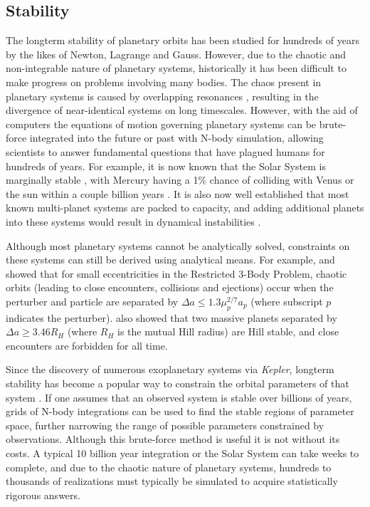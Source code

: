 \documentclass[12pt,letter]{aastex}
\newcommand{\kep}{{\it Kepler}\xspace}
\begin{document}
\subsection{Stability}
The longterm stability of planetary orbits has been studied for hundreds of years by the likes of Newton, Lagrange and Gauss. 
However, due to the chaotic and non-integrable nature of planetary systems, historically it has been difficult to make progress on problems involving many bodies.  
The chaos present in planetary systems is caused by overlapping resonances \citep{Chirikov1979, Lecar2001}, resulting in the divergence of near-identical systems on long timescales. 
However, with the aid of computers the equations of motion governing planetary systems can be brute-force integrated into the future or past with N-body simulation, allowing scientists to answer fundamental questions that have plagued humans for hundreds of years. 
For example, it is now known that the Solar System is marginally stable \citep{Sussman1988, Laskar1994, Lecar2001}, with Mercury having a 1\% chance of colliding with Venus or the sun within a couple billion years \citep{Laskar2009}.
It is also now well established that most known multi-planet systems are packed to capacity, and adding additional planets into these systems would result in dynamical instabilities \citep{Fang2013,Pu2015}.

Although most planetary systems cannot be analytically solved, constraints on these systems can still be derived using analytical means.
For example, \citet{Wisdom1980} and \citet{Duncan1989} showed that for small eccentricities in the Restricted 3-Body Problem, chaotic orbits (leading to close encounters, collisions and ejections) occur when the perturber and particle are separated by $\Delta a \le 1.3\mu_p^{2/7}a_p$ (where subscript $p$ indicates the perturber). 
\citet{Gladman1993} also showed that two massive planets separated by $\Delta a \ge 3.46 R_H$ (where $R_H$ is the mutual Hill radius) are Hill stable, and close encounters are forbidden for all time. 

Since the discovery of numerous exoplanetary systems via \kep, longterm stability has become a popular way to constrain the orbital parameters of that system \citep{Lissauer2011, Steffen2013, Jontof-Hutter2014, Tamayo2015}. 
If one assumes that an observed system is stable over billions of years, grids of N-body integrations can be used to find the stable regions of parameter space, further narrowing the range of possible parameters constrained by observations. 
Although this brute-force method is useful it is not without its costs. 
A typical 10 billion year integration or the Solar System can take weeks to complete, and due to the chaotic nature of planetary systems, hundreds to thousands of realizations must typically be simulated to acquire statistically rigorous answers. 



\end{document}
